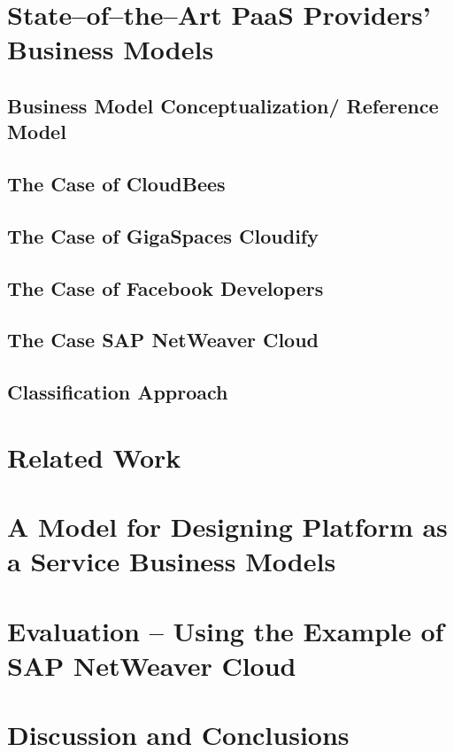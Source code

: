 
\chapter{State--of--the--Art PaaS Providers' Business Models}

	\section{Business Model Conceptualization/ Reference Model}
	
	\section{The Case of CloudBees}
	\section{The Case of GigaSpaces Cloudify}
	\section{The Case of Facebook Developers}
	
	\section{The Case SAP NetWeaver Cloud}
	
	\section{Classification Approach}
	

\chapter{Related Work}


\chapter{A Model for Designing Platform as a Service Business Models}

\chapter{Evaluation -- Using the Example of SAP NetWeaver Cloud}

\chapter{Discussion and Conclusions}



